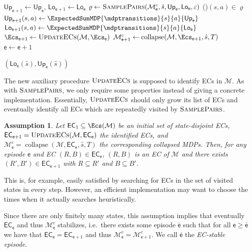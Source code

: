 \documentclass{article}
\newcommand{\MDP}{\mathcal{M}}
\newcommand{\initialstate}{\hat{s}}
\newcommand{\finitepath}{\varrho}
\newcommand{\upperbound}{\mathsf{Up}}
\newcommand{\lowerbound}{\mathsf{Lo}}
\newcommand{\targetset}{T}
\newcommand{\samplepath}{\textsc{SamplePairs}}
\DeclareMathOperator{\collapse}{collapse}
\newcommand{\updateecs}{\textsc{UpdateECs}}
\newcommand{\algoepisode}{\mathsf{e}}
\newcommand{\algoecs}{\mathsf{EC}}
\newtheorem{assumption}{Assumption}
\begin{document}
\begin{algorithm}[t]
{ 		$\upperbound_{\algoepisode + 1} \gets \upperbound_\algoepisode$, $\lowerbound_{\algoepisode + 1} \gets \lowerbound_\algoepisode$ \;
 		$\finitepath \gets \samplepath(\MDP^c_\algoepisode, \initialstate, \upperbound_\algoepisode, \lowerbound_\algoepisode, \varepsilon)$   		
 		\ForAll(){$(s,a) \in \finitepath$}{ 
 			$\upperbound_{\algoepisode + 1}(s, a) \gets \ExpectedSumMDP{\mdptransitions}{s}{a}{\upperbound_\algoepisode}$ \label{alg:brtdp:line:update_u} \;
 			$\lowerbound_{\algoepisode + 1}(s, a) \gets \ExpectedSumMDP{\mdptransitions}{s}{a}{\lowerbound_\algoepisode}$ \label{alg:brtdp:line:update_l} \;
 		}
 		$\Ecs_{\algoepisode + 1} \gets \updateecs(\MDP, \Ecs_\algoepisode)$  
 		$\MDP^c_{\algoepisode + 1} \gets \collapse(\MDP, \Ecs_{\algoepisode + 1}, \initialstate, \targetset)$  \label{alg:brtdp:line:collapse} 		
 		$\algoepisode \gets \algoepisode + 1$ \;
 	}
 	
 	\Return $(\lowerbound_\algoepisode(\initialstate), \upperbound_\algoepisode(\initialstate))$ \;
 \end{algorithm}
 
The new auxiliary procedure $\updateecs$ is supposed to identify ECs in $\MDP$.
As with $\samplepath$, we only require some properties instead of giving a concrete implementation.
Essentially, $\updateecs$ should only grow its list of ECs and eventually identify all ECs which are repeatedly visited by $\samplepath$.

\begin{assumption} \label{asm:updateecs_growing}
	Let $\algoecs_1 \subseteq \Ecs(\MDP)$ be an initial set of state-disjoint ECs, $\algoecs_{\algoepisode+1} = \updateecs(\MDP, \algoecs_\algoepisode)$ the identified ECs, and $\MDP^c_\algoepisode = \collapse(\MDP, \algoecs_\algoepisode, \initialstate, \targetset)$ the corresponding collapsed MDPs.
	Then, for any episode $\algoepisode$ and EC $(R, B) \in \algoecs_\algoepisode$, $(R, B)$ is an EC of $\MDP$ and there exists $(R', B') \in \algoecs_{\algoepisode+1}$ with $R \subseteq R'$ and $B \subseteq B'$.
\end{assumption}
This is, for example, easily satisfied by searching for ECs in the set of visited states in every step.
However, an efficient implementation may want to choose the times when it actually searches heuristically.

Since there are only finitely many states, this assumption implies that eventually $\algoecs_\algoepisode$ and thus $\MDP^c_\algoepisode$ stabilizes, i.e.\ there exists some episode $\overline{\algoepisode}$ such that for all $\algoepisode \geq \overline{\algoepisode}$ we have that $\algoecs_\algoepisode = \algoecs_{\algoepisode+1}$ and thus $\MDP^c_\algoepisode = \MDP^c_{\algoepisode+1}$.
We call $\overline{\algoepisode}$ the \emph{EC-stable episode}.
\end{document}
